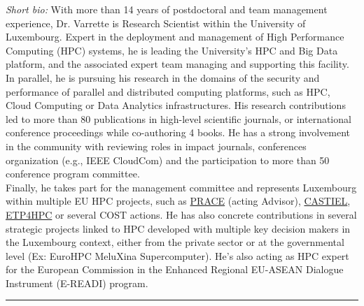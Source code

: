 \documentclass{cv}
\begin{document}
\emph{Short bio:}
With more than 14 years of postdoctoral and team management experience, Dr. Varrette is Research Scientist within the University of Luxembourg.
Expert in the deployment and management of High Performance Computing (HPC) systems, he is leading the University’s HPC and Big Data platform, and  the associated expert team managing and supporting this facility.\\
In parallel, he is pursuing his research in the domains of the security and performance of parallel and distributed computing platforms, such as HPC, Cloud Computing or Data Analytics infrastructures.
His research contributions led to more than 80 publications in high-level scientific journals, or international conference proceedings while co-authoring 4 books. He has a strong involvement in the community with reviewing roles in impact journals, conferences organization (e.g., IEEE CloudCom) and the participation to more than 50 conference program committee.\\
Finally, he takes part for the management committee and represents Luxembourg within multiple EU HPC projects, such as \href{http://www.prace-ri.eu/}{PRACE} (acting Advisor), \href{https://www.castiel-project.eu/}{CASTIEL}, \href{http://www.etp4hpc.eu/}{ETP4HPC} or several COST actions. He has also concrete contributions in several strategic projects linked to HPC developed with multiple key decision makers in the Luxembourg context, either from the private sector or at the governmental level (Ex: EuroHPC MeluXina Supercomputer). He's also acting as HPC expert for the European Commission in the Enhanced Regional EU-ASEAN Dialogue Instrument (E-READI) program.


\noindent\rule{\textwidth}{0.4pt}
\end{document}
